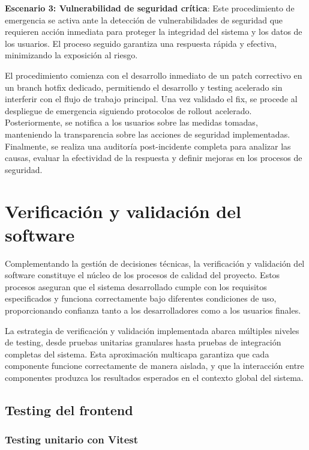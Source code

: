\documentclass[12pt,a4paper,oneside]{report}
\begin{document}
\textbf{Escenario 3: Vulnerabilidad de seguridad crítica}: Este procedimiento de emergencia se activa ante la detección de vulnerabilidades de seguridad que requieren acción inmediata para proteger la integridad del sistema y los datos de los usuarios. El proceso seguido garantiza una respuesta rápida y efectiva, minimizando la exposición al riesgo.

El procedimiento comienza con el desarrollo inmediato de un patch correctivo en un branch hotfix dedicado, permitiendo el desarrollo y testing acelerado sin interferir con el flujo de trabajo principal. Una vez validado el fix, se procede al despliegue de emergencia siguiendo protocolos de rollout acelerado. Posteriormente, se notifica a los usuarios sobre las medidas tomadas, manteniendo la transparencia sobre las acciones de seguridad implementadas. Finalmente, se realiza una auditoría post-incidente completa para analizar las causas, evaluar la efectividad de la respuesta y definir mejoras en los procesos de seguridad.

\section{Verificación y validación del
software}\label{verificaciuxf3n-y-validaciuxf3n-del-software}

Complementando la gestión de decisiones técnicas, la verificación y
validación del software constituye el núcleo de los procesos de calidad
del proyecto. Estos procesos aseguran que el sistema desarrollado cumple
con los requisitos especificados y funciona correctamente bajo
diferentes condiciones de uso, proporcionando confianza tanto a los
desarrolladores como a los usuarios finales.

La estrategia de verificación y validación implementada abarca múltiples
niveles de testing, desde pruebas unitarias granulares hasta pruebas de
integración completas del sistema. Esta aproximación multicapa garantiza
que cada componente funcione correctamente de manera aislada, y que la
interacción entre componentes produzca los resultados esperados en el
contexto global del sistema.

\subsection{Testing del frontend}\label{testing-del-frontend}

\subsubsection{Testing unitario con
Vitest}\label{testing-unitario-con-vitest}
\end{document}
